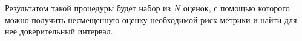 Результатом такой процедуры будет набор из $N$ оценок, с помощью которого можно получить несмещенную оценку необходимой риск-метрики и найти для неё доверительный интервал. 

